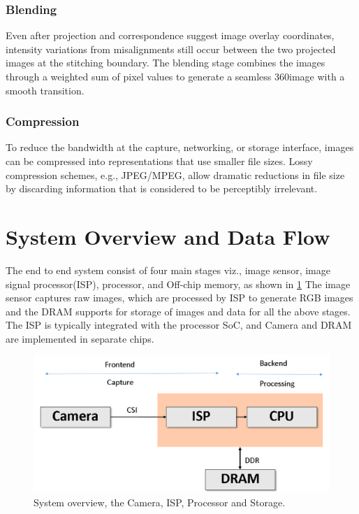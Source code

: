 \subsubsection{Blending}  Even after projection and correspondence suggest image overlay coordinates, intensity variations from misalignments still occur between the two projected images at the stitching boundary. The blending stage combines the images through a weighted sum of pixel values to generate a seamless 360\textdegree    image with a smooth transition.	 
\subsubsection{Compression}  To reduce the bandwidth at the capture, networking, or storage interface, images can be compressed into representations that use smaller file sizes. Lossy compression schemes, e.g., JPEG/MPEG, allow dramatic reductions in file size by discarding information that is considered to be perceptibly irrelevant.


\section{System Overview and Data Flow}

The end to end system consist of four main stages viz., image sensor, image signal processor(ISP), processor, and Off-chip memory, as shown in \ref{fig:Sys_overview} The image sensor captures raw images, which are processed by ISP to generate RGB images and the DRAM supports for storage of images and data for all the above stages. The ISP is typically integrated with the processor SoC, and Camera and DRAM are implemented in separate chips.
 
\begin{figure}[h]
	\begin{center}
		\includegraphics[width=1\textwidth]{data/images/System_overview.png}
	\end{center}
		\caption{System overview, the Camera, ISP, Processor and Storage.}
\label{fig:Sys_overview}
\end{figure} 

